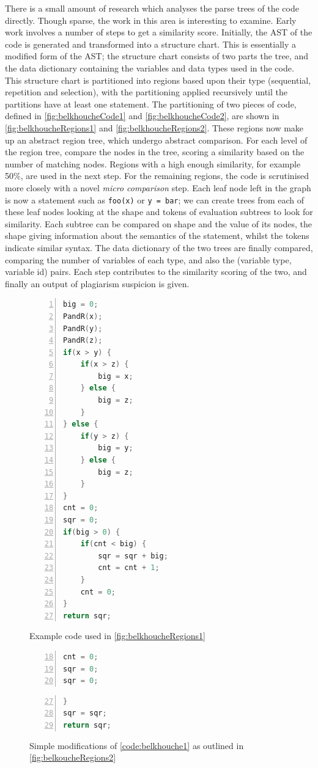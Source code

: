There is a small amount of research which analyses the parse trees
of the code directly. Though sparse, the work in this area is interesting
to examine. Early work \cite{Belkhouche} involves a number of steps to get
a similarity score. Initially, the AST of the code is generated and transformed
into a structure chart. This is essentially a modified form of the AST;
the structure chart consists of two parts the tree, and the data dictionary
containing the variables and data types used in the code\cite{Belkouche}. This structure
chart is partitioned into regions based upon their type (sequential, repetition
and selection), with the partitioning applied recursively until the partitions
have at least one statement. The partitioning of two pieces of code, defined in
\cref{fig:belkhoucheCode1} and \cref{fig:belkhoucheCode2}, are shown in
\cref{fig:belkhoucheRegions1} and \cref{fig:belkhoucheRegions2}. These regions
now make up an abstract region tree, which undergo abstract comparison. For
each level of the region tree, compare the nodes in the tree, scoring a similarity
based on the number of matching nodes. Regions with a high enough similarity,
for example 50\%, are used in the next step. For the remaining regions, the code
is scrutinised more closely with a novel \emph{micro comparison} step. Each
leaf node left in the graph is now a statement such as \texttt{foo(x)} or
\texttt{y = bar}; we can create trees from each of these leaf nodes
looking at the shape and tokens of evaluation subtrees to look for similarity. 
Each subtree can be compared on shape and the value of its nodes, the shape
giving information about the semantics of the statement, whilst the tokens
indicate similar syntax.
The data dictionary of the two trees are finally compared, comparing the number
of variables of each type, and also the (variable type, variable id) pairs.
Each step contributes to the similarity scoring of the two, and finally an output
of plagiarism suspicion is given.

\begin{figure}[p]
\begin{lstlisting}[language=C, numbers=left]
big = 0;
PandR(x);
PandR(y);
PandR(z);
if(x > y) {
	if(x > z) {
		big = x;
	} else {
		big = z;
	}
} else {
	if(y > z) {
		big = y;
	} else {
		big = z;
	}
}
cnt = 0;
sqr = 0;
if(big > 0) {
	if(cnt < big) {
		sqr = sqr + big;
		cnt = cnt + 1;
	}
	cnt = 0;
}
return sqr;
\end{lstlisting}
\caption{Example code used in \cref{fig:belkhoucheRegions1}}
\label{code:belkhouche1}

\begin{lstlisting}[firstnumber=18, language=C, numbers=left]
cnt = 0;
sqr = 0;
sqr = 0;
\end{lstlisting}

\begin{lstlisting}[firstnumber=27, language=C, numbers=left]
}
sqr = sqr;
return sqr;
\end{lstlisting}
\caption{Simple modifications of \cref{code:belkhouche1} as outlined in
\cref{fig:belkoucheRegions2}}
\label{code:belkhouche2}
\end{figure}



